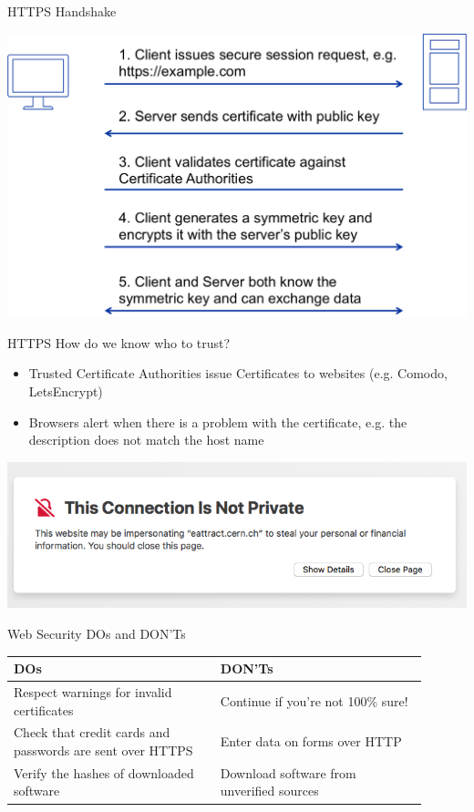 \documentclass{beamer}
\begin{document}
\begin{frame}{{\color{red}HTTPS Handshake}}
\begin{center}
\includegraphics[width=0.8\linewidth]{https-flow.png} 
\end{center}
\end{frame}


\begin{frame}{HTTPS}
How do we know who to trust?
\begin{itemize}
\item Trusted Certificate Authorities issue Certificates to websites (e.g. Comodo, LetsEncrypt)
\item Browsers alert when there is a problem with the certificate, e.g. the description does not match the host name
\end{itemize}
\begin{center}
\includegraphics[width=0.5\linewidth]{certificate-error.png}
\end{center}
\end{frame}

\begin{frame}{Web Security DOs and DON'Ts}
\begin{center}
\begin{tabular}{ |p{0.45\linewidth}|p{0.45\linewidth}| }
\hline
\textbf{DOs} & \textbf{DON'Ts} \\ \hline \hline
Respect warnings for invalid certificates & Continue if you're not 100\% sure!\\ \hline
Check that credit cards and passwords are sent over HTTPS & Enter data on forms over HTTP\\ \hline
Verify the hashes of downloaded software & Download software from unverified sources\\ \hline 
\end{tabular}
\end{center}
\end{frame}
\end{document}
